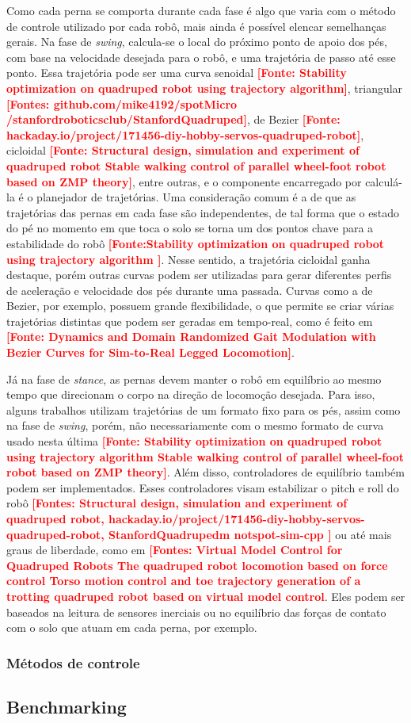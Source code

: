 \documentclass[../main.tex]{subfiles}
\begin{document}
  Como cada perna se comporta durante cada fase é algo que varia com o método de controle utilizado por cada robô, mais ainda é possível elencar semelhanças gerais. Na fase de \textit{swing}, calcula-se o local do próximo ponto de apoio dos pés, com base na velocidade desejada para o robô, e uma trajetória de passo até esse ponto. Essa trajetória pode ser uma curva senoidal \textbf{\textcolor{red}{[Fonte: Stability optimization on quadruped robot using trajectory algorithm]}}, triangular \textbf{\textcolor{red}{[Fontes: github.com/mike4192/spotMicro /stanfordroboticsclub/StanfordQuadruped]}}, de Bezier \textbf{\textcolor{red}{[Fonte: hackaday.io/project/171456-diy-hobby-servos-quadruped-robot]}}, cicloidal \textbf{\textcolor{red}{[Fonte: Structural design, simulation and experiment of quadruped robot Stable walking control of parallel wheel-foot robot based on ZMP theory]}}, entre outras, e o componente encarregado por calculá-la é o planejador de trajetórias. Uma consideração comum é a de que as trajetórias das pernas em cada fase são independentes, de tal forma que o estado do pé no momento em que toca o solo se torna um dos pontos chave para a estabilidade do robô  \textbf{\textcolor{red}{[Fonte:Stability optimization on quadruped robot using trajectory algorithm
  ]}}. Nesse sentido, a trajetória cicloidal ganha destaque, porém outras curvas podem ser utilizadas para gerar diferentes perfis de aceleração e velocidade dos pés durante uma passada. Curvas como a de Bezier, por exemplo, possuem grande flexibilidade, o que permite se criar várias trajetórias distintas que podem ser geradas em tempo-real, como é feito em  \textbf{\textcolor{red}{[Fonte: Dynamics and Domain Randomized Gait Modulation with Bezier Curves for Sim-to-Real Legged Locomotion]}}.

  Já na fase de \textit{stance}, as pernas devem manter o robô em equilíbrio ao mesmo tempo que direcionam o corpo na direção de locomoção desejada. Para isso, alguns trabalhos utilizam trajetórias de um formato fixo para os pés, assim como na fase de \textit{swing}, porém, não necessariamente com o mesmo formato de curva usado nesta última \textbf{\textcolor{red}{[Fonte: Stability optimization on quadruped robot using trajectory algorithm Stable walking control of parallel wheel-foot robot based on ZMP theory]}}. Além disso, controladores de equilíbrio também podem ser implementados. Esses controladores visam estabilizar o pitch e roll do robô \textbf{\textcolor{red}{[Fontes: Structural design, simulation and experiment of quadruped robot, hackaday.io/project/171456-diy-hobby-servos-quadruped-robot, StanfordQuadrupedm notspot-sim-cpp ]}} ou até mais graus de liberdade, como em \textbf{\textcolor{red}{[Fontes: Virtual Model Control for Quadruped Robots The quadruped robot locomotion based on force control Torso motion control and toe trajectory generation of a trotting quadruped robot based on virtual model control}}. Eles podem ser baseados na leitura de sensores inerciais ou no equilíbrio das forças de contato com o solo que atuam em cada perna, por exemplo.


  \subsubsection{Métodos de controle}




  \subsection{Benchmarking}

  
\end{document}
